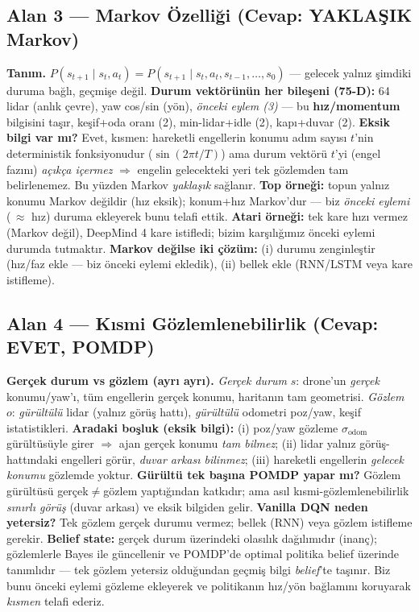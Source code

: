 \documentclass[11pt,a4paper]{article}
\begin{document}
\subsection*{Alan 3 --- Markov Özelliği \textnormal{(Cevap: \textbf{YAKLAŞIK Markov})}}
\textbf{Tanım.} $P(s_{t+1}\mid s_t,a_t)=P(s_{t+1}\mid s_t,a_t,s_{t-1},\dots,s_0)$ ---
gelecek yalnız şimdiki duruma bağlı, geçmişe değil. \textbf{Durum vektörünün her
bileşeni (75-D):} 64 lidar (anlık çevre), yaw cos/sin (yön), \emph{önceki eylem (3)}
--- bu \textbf{hız/momentum} bilgisini taşır, keşif+oda oranı (2), min-lidar+idle (2),
kapı+duvar (2). \textbf{Eksik bilgi var mı?} Evet, kısmen: hareketli engellerin konumu
adım sayısı $t$'nin deterministik fonksiyonudur ($\sin(2\pi t/T)$) ama durum vektörü
$t$'yi (engel fazını) \emph{açıkça içermez} $\Rightarrow$ engelin gelecekteki yeri tek
gözlemden tam belirlenemez. Bu yüzden Markov \emph{yaklaşık} sağlanır.
\textbf{Top örneği:} topun yalnız konumu Markov değildir (hız eksik); konum+hız
Markov'dur --- biz \emph{önceki eylemi} (\,$\approx$ hız) duruma ekleyerek bunu telafi
ettik. \textbf{Atari örneği:} tek kare hızı vermez (Markov değil), DeepMind 4 kare
istifledi; bizim karşılığımız önceki eylemi durumda tutmaktır. \textbf{Markov değilse iki
çözüm:} (i) durumu zenginleştir (hız/faz ekle --- biz önceki eylemi ekledik), (ii) bellek
ekle (RNN/LSTM veya kare istifleme).

\subsection*{Alan 4 --- Kısmi Gözlemlenebilirlik \textnormal{(Cevap: \textbf{EVET, POMDP})}}
\textbf{Gerçek durum vs gözlem (ayrı ayrı).} \emph{Gerçek durum} $s$: drone'un
\emph{gerçek} konumu/yaw'ı, tüm engellerin gerçek konumu, haritanın tam geometrisi.
\emph{Gözlem} $o$: \emph{gürültülü} lidar (yalnız görüş hattı), \emph{gürültülü}
odometri poz/yaw, keşif istatistikleri. \textbf{Aradaki boşluk (eksik bilgi):}
(i) poz/yaw gözleme $\sigma_{\text{odom}}$ gürültüsüyle girer $\Rightarrow$ ajan gerçek
konumu \emph{tam bilmez}; (ii) lidar yalnız görüş-hattındaki engelleri görür, \emph{duvar
arkası bilinmez}; (iii) hareketli engellerin \emph{gelecek konumu} gözlemde yoktur.
\textbf{Gürültü tek başına POMDP yapar mı?} Gözlem gürültüsü gerçek$\neq$gözlem yaptığından
katkıdır; ama asıl kısmi-gözlemlenebilirlik \emph{sınırlı görüş} (duvar arkası) ve eksik
bilgiden gelir. \textbf{Vanilla DQN neden yetersiz?} Tek gözlem gerçek durumu vermez;
bellek (RNN) veya gözlem istifleme gerekir. \textbf{Belief state:} gerçek durum üzerindeki
olasılık dağılımıdır (inanç); gözlemlerle Bayes ile güncellenir ve POMDP'de optimal
politika belief üzerinde tanımlıdır --- tek gözlem yetersiz olduğundan geçmiş bilgi
\emph{belief}'te taşınır. Biz bunu önceki eylemi gözleme ekleyerek ve politikanın hız/yön
bağlamını koruyarak \emph{kısmen} telafi ederiz.
\end{document}

